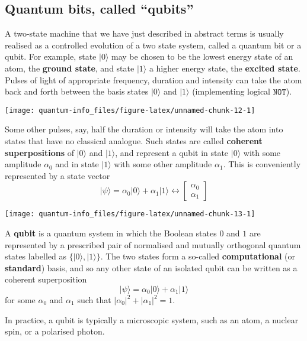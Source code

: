 \documentclass[fleqn]{article}
\newenvironment{idea}{\noindent}{\medskip}
\begin{document}
\hypertarget{quantum-bits-called-qubits}{%
\subsection{Quantum bits, called ``qubits''}\label{quantum-bits-called-qubits}}

A two-state machine that we have just described in abstract terms is usually realised as a controlled evolution of a two state system, called a quantum bit or a qubit.
For example, state \(|0\rangle\) may be chosen to be the lowest energy state of an atom, the \textbf{ground state}, and state \(|1\rangle\) a higher energy state, the \textbf{excited state}.
Pulses of light of appropriate frequency, duration and intensity can take the atom back and forth between the basis states \(|0\rangle\) and \(|1\rangle\) (implementing logical \(\texttt{NOT}\)).

\begin{center}\texttt{[image: quantum-info\_files/figure-latex/unnamed-chunk-12-1]} \end{center}

Some other pulses, say, half the duration or intensity will take the atom into states that have no classical analogue.
Such states are called \textbf{coherent superpositions} of \(|0\rangle\) and \(|1\rangle\), and represent a qubit in state \(|0\rangle\) with some amplitude \(\alpha_0\) and in state \(|1\rangle\) with some other amplitude \(\alpha_1\).
This is conveniently represented by a state vector
\[
    |\psi\rangle =
    \alpha_0|0\rangle + \alpha_1|1\rangle
    \leftrightarrow
    \begin{bmatrix}
      \alpha_0
    \\\alpha_1
    \end{bmatrix}
\]

\begin{center}\texttt{[image: quantum-info\_files/figure-latex/unnamed-chunk-13-1]} \end{center}

\begin{idea}

A \textbf{qubit} is a quantum system in which the Boolean states \(0\) and \(1\) are represented by a prescribed pair of normalised and mutually orthogonal quantum states labelled as \(\{|0\rangle,|1\rangle\}\).
The two states form a so-called \textbf{computational} (or \textbf{standard}) basis, and so any other state of an isolated qubit can be written as a coherent superposition
\[
  |\psi\rangle = \alpha_0|0\rangle + \alpha_1|1\rangle
\]
for some \(\alpha_0\) and \(\alpha_1\) such that \(|\alpha_0|^2 + |\alpha_1|^2 = 1\).

In practice, a qubit is typically a microscopic system, such as an atom, a nuclear spin, or a polarised photon.

\end{idea}
\end{document}
